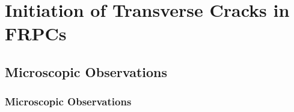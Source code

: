 \documentclass[first,firstsupp,lastsupp,last,hyperref,table]{ETHclass}
\begin{document}
\section{Initiation of Transverse Cracks in FRPCs}

\subsection{Microscopic Observations}

\begin{frame}
\frametitle{\vspace{0.3cm}\small Microscopic Observations}
\vspace{-0.5cm}
\centering
\captionsetup[subfigure]{labelfont=footnotesize}
\begin{tikzpicture}



\end{tikzpicture}
\end{frame}
\end{document}
